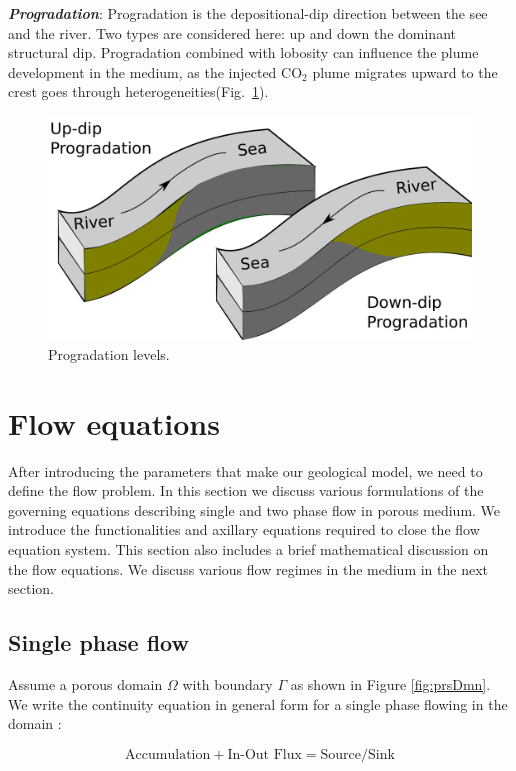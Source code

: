 \textbf{\textit{Progradation}}: 
Progradation is the depositional-dip direction between the see and the river.
Two types are considered here: up and down the dominant structural dip.
Progradation combined with lobosity can influence the plume development in the
medium, as the injected $\mbox{CO}_2$ plume migrates upward to the crest goes
through heterogeneities(Fig.~\ref{fig:proLvl}).


\begin{figure}[thb]
  \centering
  \includegraphics[width=0.65 \linewidth]{./figurer/progradation} 
  \caption{Progradation levels.}
  \label{fig:proLvl}
%
\end{figure}

\section{Flow equations}
\label{sec:FlowEquations}
After introducing the parameters that make our geological model, we need to
define the flow problem. In this section we discuss various formulations of the
governing equations describing single and two phase flow in porous medium. We
introduce the functionalities and axillary equations required to close the flow
equation system. This section also includes a brief mathematical discussion on
the flow equations. We discuss various flow regimes in the medium in the next
section.

\subsection{Single phase flow}

Assume a porous domain $\Omega$ with boundary $\Gamma$ as shown in Figure
\ref{fig:prsDmn}. We write the continuity equation in general form for a single
phase flowing in the domain
\cite{aavatsmark2004bevarelsesmetoder,aavatsmark2004bevarelsesmetoderHP,
celia2011geological}:

\begin{equation}
  \mbox{Accumulation}+\mbox{In-Out Flux} = \mbox{Source/Sink}
  \label{eq:ak}
\end{equation}

